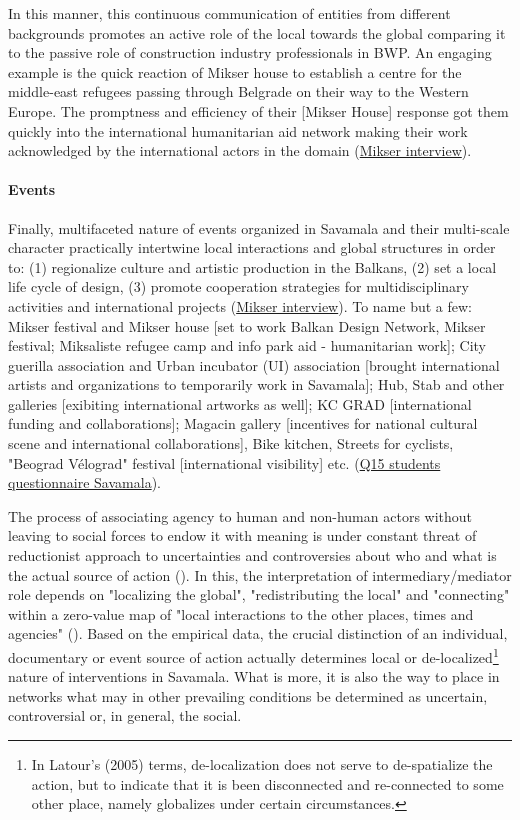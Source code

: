 \documentclass[11pt]{report}
\begin{document}
In this manner, this continuous communication of entities from different backgrounds promotes an active role of the local towards the global comparing it to the passive role of construction industry professionals in BWP.
An engaging example is the quick reaction of Mikser house to establish a centre for the middle-east refugees passing through Belgrade on their way to the Western Europe.
The promptness and efficiency of their [Mikser House] response got them quickly into the international humanitarian aid network making their work acknowledged by the international actors in the domain
(\href{}{Mikser interview}).

\paragraph{Events}

Finally, multifaceted nature of events organized in Savamala and their multi-scale character practically intertwine local interactions and global structures in order to:
(1) regionalize culture and artistic production in the Balkans,
(2) set a local life cycle of design,
(3) promote cooperation strategies for multidisciplinary activities and international projects (\href{}{Mikser interview}).
To name but a few:
Mikser festival and Mikser house [set to work Balkan Design Network, Mikser festival; 
Miksaliste refugee camp and info park aid - humanitarian work];
City guerilla association and Urban incubator (UI) association [brought international artists and organizations to temporarily work in Savamala];
Hub, Stab and other galleries [exibiting international artworks as well];
KC GRAD [international funding and collaborations];
Magacin gallery [incentives for national cultural scene and international collaborations],
Bike kitchen, Streets for cyclists, "Beograd Vélograd" festival [international visibility]
etc.
(\href{}{Q15 students questionnaire Savamala}).

The process of associating agency to human and non-human actors without leaving to social forces to endow it with meaning is under constant threat of reductionist approach to uncertainties and controversies about who and what is the actual source of action (\cite{Latour 2005}).
In this, the interpretation of intermediary/mediator role depends on "localizing the global", "redistributing the local" and "connecting" within a zero-value map of "local interactions to the other places, times and agencies" (\cite{Latour 2005}).
Based on the empirical data, the crucial distinction of an individual, documentary or event source of action actually determines local or de-localized\footnote{In Latour's (2005) terms, de-localization does not serve to de-spatialize the action, but to indicate that it is been disconnected and re-connected to some other place, namely globalizes under certain circumstances.}
nature of interventions in Savamala.
What is more, it is also the way to place in networks what may in other prevailing conditions be determined as uncertain, controversial or, in general, the social.
\end{document}
